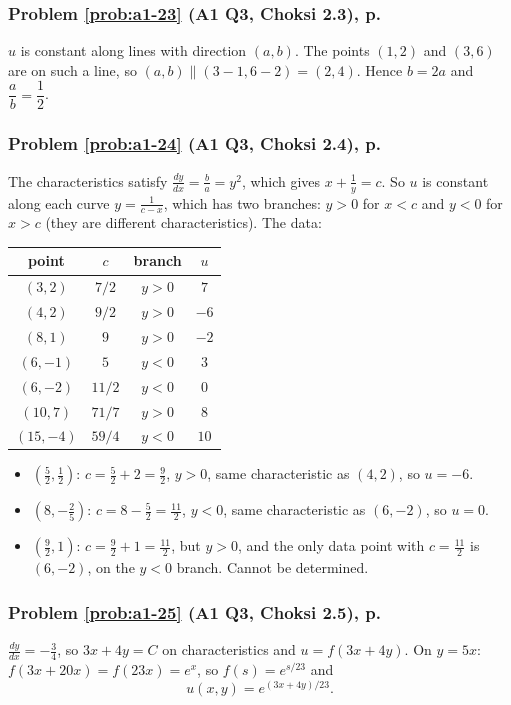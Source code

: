 \documentclass{article}
\begin{document}
\label{sol:a1-23}
\subsubsection*{Problem \ref{prob:a1-23} (A1 Q3, Choksi 2.3), p.~\pageref{prob:a1-23}}
$u$ is constant along lines with direction $(a,b)$. The points $(1,2)$ and $(3,6)$ are on such a line, so $(a,b) \parallel (3-1, 6-2) = (2,4)$. Hence $b = 2a$ and $\dfrac ab = \dfrac12$.

\label{sol:a1-24}
\subsubsection*{Problem \ref{prob:a1-24} (A1 Q3, Choksi 2.4), p.~\pageref{prob:a1-24}}
The characteristics satisfy $\frac{dy}{dx} = \frac ba = y^2$, which gives $x + \frac1y = c$. So $u$ is constant along each curve $y = \frac{1}{c - x}$, which has two branches: $y > 0$ for $x < c$ and $y < 0$ for $x > c$ (they are different characteristics). The data:
\begin{center}
\begin{tabular}{cccc}
    point & $c$ & branch & $u$ \\
    \hline
    $(3,2)$ & $7/2$ & $y>0$ & $7$ \\
    $(4,2)$ & $9/2$ & $y>0$ & $-6$ \\
    $(8,1)$ & $9$ & $y>0$ & $-2$ \\
    $(6,-1)$ & $5$ & $y<0$ & $3$ \\
    $(6,-2)$ & $11/2$ & $y<0$ & $0$ \\
    $(10,7)$ & $71/7$ & $y>0$ & $8$ \\
    $(15,-4)$ & $59/4$ & $y<0$ & $10$
\end{tabular}
\end{center}
\begin{itemize}
    \item $(\frac52,\frac12)$: $c = \frac52 + 2 = \frac92$, $y > 0$, same characteristic as $(4,2)$, so $u = -6$.
    \item $(8,-\frac25)$: $c = 8 - \frac52 = \frac{11}{2}$, $y < 0$, same characteristic as $(6,-2)$, so $u = 0$.
    \item $(\frac92,1)$: $c = \frac92 + 1 = \frac{11}{2}$, but $y > 0$, and the only data point with $c = \frac{11}{2}$ is $(6,-2)$, on the $y < 0$ branch. Cannot be determined.
\end{itemize}

\label{sol:a1-25}
\subsubsection*{Problem \ref{prob:a1-25} (A1 Q3, Choksi 2.5), p.~\pageref{prob:a1-25}}
$\frac{dy}{dx} = -\frac34$, so $3x + 4y = C$ on characteristics and $u = f(3x + 4y)$. On $y = 5x$: $f(3x + 20x) = f(23x) = e^x$, so $f(s) = e^{s/23}$ and
\begin{equation*}
    u(x,y) = e^{(3x+4y)/23}.
\end{equation*}
\end{document}
